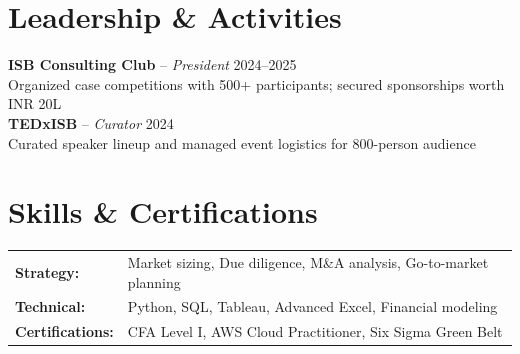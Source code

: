 \documentclass[11pt,letterpaper]{article}
\begin{document}
\section{Leadership \& Activities}
\textbf{ISB Consulting Club} -- \textit{President} \hfill 2024--2025\\
Organized case competitions with 500+ participants; secured sponsorships worth INR 20L\\[4pt]
\textbf{TEDxISB} -- \textit{Curator} \hfill 2024\\
Curated speaker lineup and managed event logistics for 800-person audience

\section{Skills \& Certifications}
\begin{tabularx}{\linewidth}{@{}lX@{}}
\textbf{Strategy:} & Market sizing, Due diligence, M\&A analysis, Go-to-market planning\\
\textbf{Technical:} & Python, SQL, Tableau, Advanced Excel, Financial modeling\\
\textbf{Certifications:} & CFA Level I, AWS Cloud Practitioner, Six Sigma Green Belt\\
\end{tabularx}
\end{document}

